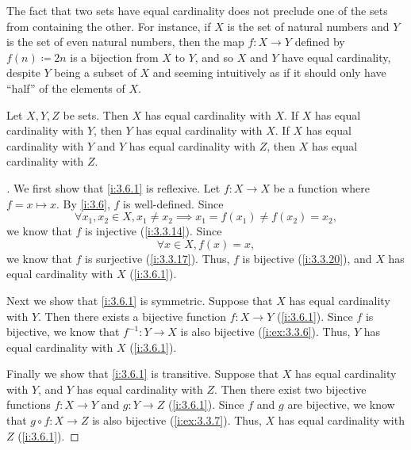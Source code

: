\setcounter{thm}{2}
\begin{rmk}\label{i:3.6.3}
  The fact that two sets have equal cardinality does not preclude one of the sets from containing the other.
  For instance, if \(X\) is the set of natural numbers and \(Y\) is the set of even natural numbers, then the map \(f : X \to Y\) defined by \(f(n) \coloneqq 2n\) is a bijection from \(X\) to \(Y\), and so \(X\) and \(Y\) have equal cardinality, despite \(Y\) being a subset of \(X\) and seeming intuitively as if it should only have ``half'' of the elements of \(X\).
\end{rmk}

\begin{prop}\label{i:3.6.4}
  Let \(X, Y, Z\) be sets.
  Then \(X\) has equal cardinality with \(X\).
  If \(X\) has equal cardinality with \(Y\), then \(Y\) has equal cardinality with \(X\).
  If \(X\) has equal cardinality with \(Y\) and \(Y\) has equal cardinality with \(Z\), then \(X\) has equal cardinality with \(Z\).
\end{prop}

\begin{proof}[]
  We first show that \cref{i:3.6.1} is reflexive.
  Let \(f : X \to X\) be a function where \(f = x \mapsto x\).
  By \cref{i:3.6}, \(f\) is well-defined.
  Since
  \[
    \forall x_1, x_2 \in X, x_1 \neq x_2 \implies x_1 = f(x_1) \neq f(x_2) = x_2,
  \]
  we know that \(f\) is injective (\cref{i:3.3.14}).
  Since
  \[
    \forall x \in X, f(x) = x,
  \]
  we know that \(f\) is surjective (\cref{i:3.3.17}).
  Thus, \(f\) is bijective (\cref{i:3.3.20}), and \(X\) has equal cardinality with \(X\) (\cref{i:3.6.1}).

  Next we show that \cref{i:3.6.1} is symmetric.
  Suppose that \(X\) has equal cardinality with \(Y\).
  Then there exists a bijective function \(f : X \to Y\) (\cref{i:3.6.1}).
  Since \(f\) is bijective, we know that \(f^{-1} : Y \to X\) is also bijective (\cref{i:ex:3.3.6}).
  Thus, \(Y\) has equal cardinality with \(X\) (\cref{i:3.6.1}).

  Finally we show that \cref{i:3.6.1} is transitive.
  Suppose that \(X\) has equal cardinality with \(Y\), and \(Y\) has equal cardinality with \(Z\).
  Then there exist two bijective functions \(f : X \to Y\) and \(g : Y \to Z\) (\cref{i:3.6.1}).
  Since \(f\) and \(g\) are bijective, we know that \(g \circ f : X \to Z\) is also bijective (\cref{i:ex:3.3.7}).
  Thus, \(X\) has equal cardinality with \(Z\) (\cref{i:3.6.1}).
\end{proof}

